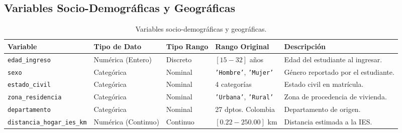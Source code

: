 \documentclass[11pt,a4paper]{article}
\begin{document}
\subsection{Variables Socio-Demográficas y Geográficas}
\begin{table}[htbp]
\centering
\small
\begin{tabularx}{\textwidth}{l l l l X}
\toprule
\textbf{Variable} & \textbf{Tipo de Dato} & \textbf{Tipo Rango} & \textbf{Rango Original} & \textbf{Descripción} \\
\midrule
\texttt{edad\_ingreso} & Numérica (Entero) & Discreto & $[15 - 32]$ años & Edad del estudiante al ingresar. \\
\texttt{sexo} & Categórica & Nominal & \texttt{'Hombre'}, \texttt{'Mujer'} & Género reportado por el estudiante. \\
\texttt{estado\_civil} & Categórica & Nominal & 4 categorías & Estado civil en matrícula. \\
\texttt{zona\_residencia} & Categórica & Nominal & \texttt{'Urbana'}, \texttt{'Rural'} & Zona de procedencia de vivienda. \\
\texttt{departamento} & Categórica & Nominal & 27 dptos. Colombia & Departamento de origen. \\
\texttt{distancia\_hogar\_ies\_km} & Numérica (Continuo) & Continuo & $[0.22 - 250.00]$ km & Distancia estimada a la IES. \\
\bottomrule
\end{tabularx}
\caption{Variables socio-demográficas y geográficas.}
\end{table}
\end{document}

